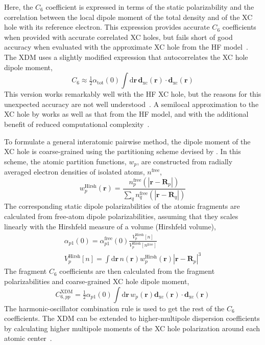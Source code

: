 Here, the $C_6$ coefficient is expressed in terms of the static polarizability and the correlation between the local dipole moment of the total density and of the XC hole with its reference electron.
This expression provides accurate $C_6$ coefficients when provided with accurate correlated XC holes, but fails short of good accuracy when evaluated with the approximate XC hole from the HF model~\cite{AngyanJCP07}.
The XDM uses a slightly modified expression that autocorrelates the XC hole dipole moment,
\begin{equation}
  C_6\approx\tfrac12\alpha_\text{tot}(0)\int\mathrm d\mathbf r\,\mathbf d_\text{xc}(\mathbf r)\cdot\mathbf d_\text{xc}(\mathbf r)
\end{equation}
This version works remarkably well with the HF XC hole, but the reasons for this unexpected accuracy are not well understood~\cite{AngyanJCP07,HesselmannJCP09,AyersJMC09}.
A semilocal approximation to the XC hole by \citet{BeckePRA89} works as well as that from the HF model, and with the additional benefit of reduced computational complexity~\cite{BeckeJCP05a}.

To formulate a general interatomic pairwise method, the dipole moment of the XC hole is coarse-grained using the partitioning scheme devised by \citet{HirshfeldTCA77}.
In this scheme, the atomic partition functions, $w_p$, are constructed from radially averaged electron densities of isolated atoms, $n^\text{free}$,
\begin{equation}
  w^\text{Hirsh}_p(\mathbf r)=
  \frac{n^\text{free}_p(|\mathbf r-\mathbf R_p|)}
  {\sum_q n^\text{free}_q(|\mathbf r-\mathbf R_q|)}
  \label{eq:hirshfeld}
\end{equation}
The corresponding static dipole polarizabilities of the atomic fragments are calculated from free-atom dipole polarizabilities, assuming that they scales linearly with the Hirshfeld measure of a volume (Hirshfeld volume),
\begin{gather}
  \alpha_{p1}(0)=\alpha_{p1}^\text{free}(0)\frac{V^\text{Hirsh}_p[n]}{V^\text{Hirsh}_p[n^\text{free}]} \\
  V_p^\text{Hirsh}[n]=\int\mathrm d\mathbf r\,n(\mathbf r)w^\text{Hirsh}_p(\mathbf r)|\mathbf r-\mathbf R_p|^3
  \label{eq:hirshfeld-vol}
\end{gather}
The fragment $C_6$ coefficients are then calculated from the fragment polarizabilities and coarse-grained XC hole dipole moment,
\begin{equation}
  C_{6,pp}^\text{XDM}=\tfrac12\alpha_{p1}(0)\int\mathrm d\mathbf r\,w_p(\mathbf r)\mathbf d_\text{xc}(\mathbf r)\cdot\mathbf d_\text{xc}(\mathbf r)
\end{equation}
The harmonic-oscillator combination rule is used to get the rest of the $C_6$ coefficients.
The XDM can be extended to higher-multipole dispersion coefficients by calculating higher multipole moments of the XC hole polarization around each atomic center~\cite{BeckeJCP06,JohnsonJCP06}.

